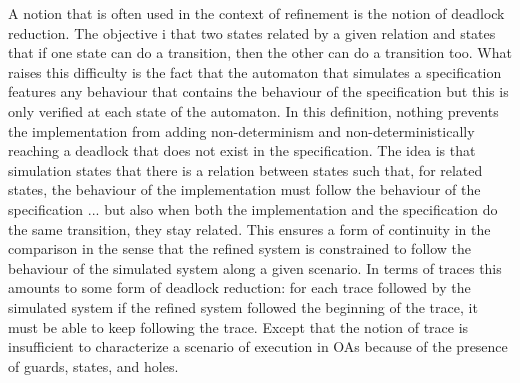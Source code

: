 \documentclass[runningheads]{llncs}
\begin{document}
A notion that is often used in the context of refinement is the notion of deadlock reduction. The objective i that two states related by a given relation and states that if one state can do a transition, then the other can do a transition too. 
What raises this difficulty is the fact that the automaton that simulates a specification features any behaviour that contains the behaviour of the specification but this is only verified at each state of the automaton. In this definition, nothing prevents the implementation from adding non-determinism and non-deterministically reaching a deadlock that does not exist in the specification.  
The idea is that simulation states that there is a relation between states such that, for related states, the behaviour of the implementation must follow the behaviour of the specification ... but also when both the implementation and the specification do the same transition, they stay related.
This ensures a form of continuity in the comparison in the sense that the refined system is constrained to follow the behaviour of the simulated system along a given scenario. 
In terms of traces this amounts to some form of deadlock reduction: for each trace followed by the simulated system if the refined system followed the beginning of the trace, it must be able to keep following the trace. Except that the notion of trace is insufficient to characterize a scenario of execution in OAs because of the presence of guards, states, and holes.

%


\end{document}
